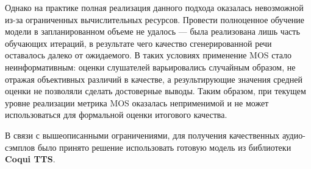 Однако на практике полная реализация данного подхода оказалась невозможной из-за ограниченных вычислительных ресурсов. Провести полноценное обучение модели в запланированном объеме не удалось — была реализована лишь часть обучающих итераций, в результате чего качество сгенерированной речи оставалось далеко от ожидаемого. В таких условиях применение MOS стало неинформативным: оценки слушателей варьировались случайным образом, не отражая объективных различий в качестве, а результирующие значения средней оценки не позволяли сделать достоверные выводы. Таким образом, при текущем уровне реализации метрика MOS оказалась неприменимой и не может использоваться для формальной оценки итогового качества.

В связи с вышеописанными ограничениями, для получения качественных аудио-сэмплов было принято решение использовать готовую модель из библиотеки \textbf{Coqui TTS}.
